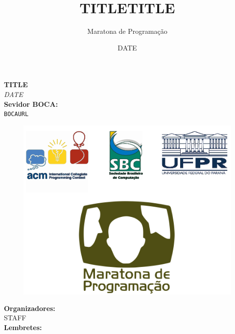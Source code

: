 \documentclass[12pt,oneside]{article} %
\title{TITLE}
\author{Maratona de Programação}
\title{TITLE}
\date{DATE}
\begin{document}
\begin{center}
\textbf{\Huge TITLE} \\
\vspace{0.2cm}
\textit{DATE} \\
\vspace{1.0cm}
\textbf{Sevidor BOCA:} \\
\texttt{\large BOCAURL} \\
\vspace{1.0cm}
\begin{figure}[h!]
	\centering
 \includegraphics[scale=0.5]{capa.png}
\end{figure}
\vspace{1.0cm}
\textbf{Organizadores:}\\
{\small STAFF} \\
\vspace{1.0cm}
\vspace{1.0cm}
\textbf{Lembretes:} \\
\end{center}
\end{document}
